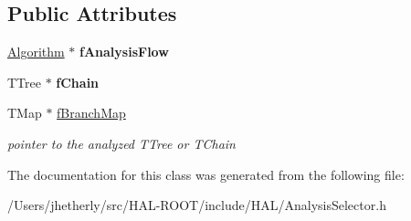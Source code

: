 \subsection*{Public Attributes}
\begin{DoxyCompactItemize}
\item 
\hypertarget{class_h_a_l_1_1_analysis_selector_a7634b6d0eb916c352968a1a6acd7f3d2}{\hyperlink{class_h_a_l_1_1_algorithm}{Algorithm} $\ast$ {\bfseries f\+Analysis\+Flow}}\label{class_h_a_l_1_1_analysis_selector_a7634b6d0eb916c352968a1a6acd7f3d2}

\item 
\hypertarget{class_h_a_l_1_1_analysis_selector_a37f6980439f0b1e94db036220eacef8f}{T\+Tree $\ast$ {\bfseries f\+Chain}}\label{class_h_a_l_1_1_analysis_selector_a37f6980439f0b1e94db036220eacef8f}

\item 
\hypertarget{class_h_a_l_1_1_analysis_selector_a4d6e0e029b502012c4bf6d4f1618625c}{T\+Map $\ast$ \hyperlink{class_h_a_l_1_1_analysis_selector_a4d6e0e029b502012c4bf6d4f1618625c}{f\+Branch\+Map}}\label{class_h_a_l_1_1_analysis_selector_a4d6e0e029b502012c4bf6d4f1618625c}

\begin{DoxyCompactList}\small\item\em pointer to the analyzed T\+Tree or T\+Chain \end{DoxyCompactList}\end{DoxyCompactItemize}


The documentation for this class was generated from the following file\+:\begin{DoxyCompactItemize}
\item 
/\+Users/jhetherly/src/\+H\+A\+L-\/\+R\+O\+O\+T/include/\+H\+A\+L/Analysis\+Selector.\+h\end{DoxyCompactItemize}
